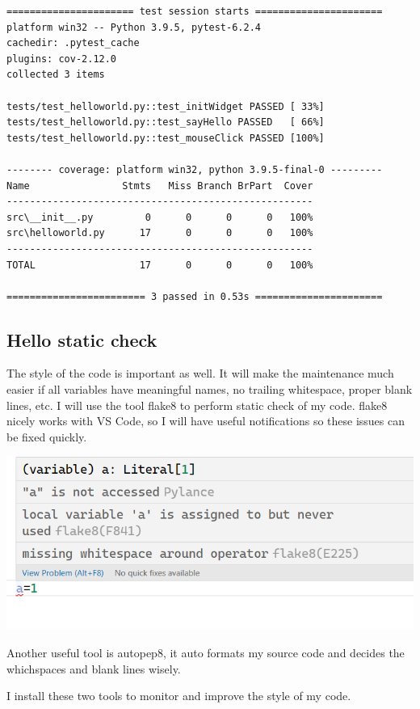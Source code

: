 \documentclass[a4paper]{report}
\begin{document}
\begin{verbatim}
====================== test session starts ======================
platform win32 -- Python 3.9.5, pytest-6.2.4
cachedir: .pytest_cache
plugins: cov-2.12.0
collected 3 items

tests/test_helloworld.py::test_initWidget PASSED [ 33%]
tests/test_helloworld.py::test_sayHello PASSED   [ 66%]
tests/test_helloworld.py::test_mouseClick PASSED [100%]

-------- coverage: platform win32, python 3.9.5-final-0 ---------
Name                Stmts   Miss Branch BrPart  Cover
-----------------------------------------------------
src\__init__.py         0      0      0      0   100%
src\helloworld.py      17      0      0      0   100%
-----------------------------------------------------
TOTAL                  17      0      0      0   100%

======================== 3 passed in 0.53s ======================
\end{verbatim}

\subsection{Hello static check}

The style of the code is important as well. It will make the maintenance much easier if all variables have meaningful names, no trailing whitespace, proper blank lines, etc. I will use the tool flake8 to perform static check of my code. flake8 nicely works with VS Code, so I will have useful notifications so these issues can be fixed quickly.

\includegraphics[width=\linewidth]{flake8.png}

Another useful tool is autopep8, it auto formats my source code and decides the whichspaces and blank lines wisely. 

I install these two tools to monitor and improve the style of my code.
\end{document}
